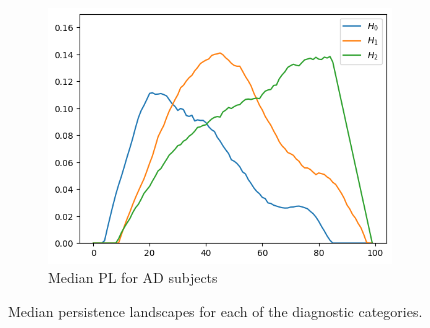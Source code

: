 \documentclass{article}
\begin{document}
\begin{figure}[htb]
\begin{subfigure}{0.32\textwidth}
    \includegraphics[width=\textwidth]{figures/median_pls/median_pl_AD_rep.png}
    \caption{Median PL for AD subjects}
  \end{subfigure}
  \caption{Median persistence landscapes for each of the diagnostic categories.}
  \label{fig:median_pls}
\end{figure}
\end{document}
